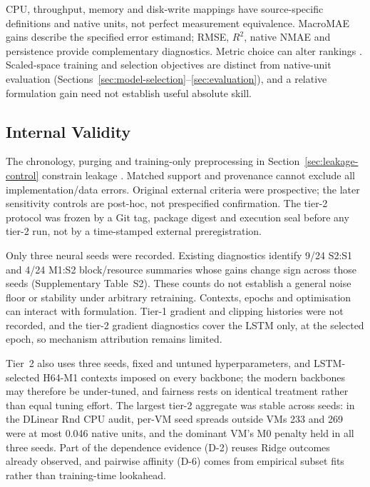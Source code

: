 \documentclass[a4paper,fleqn]{cas-dc}
\begin{document}
CPU, throughput, memory and disk-write mappings have source-specific
definitions and native units, not perfect measurement equivalence.
MacroMAE gains describe the specified error estimand; RMSE, $R^2$, native
NMAE and persistence provide complementary diagnostics. Metric choice can
alter rankings \citep{Hyndman2006Accuracy}. Scaled-space training and selection
objectives are distinct from native-unit evaluation
(Sections~\ref{sec:model-selection}--\ref{sec:evaluation}), and a relative
formulation gain need not establish useful absolute skill.

\subsection{Internal Validity}
\label{sec:threats-internal}

The chronology, purging and training-only preprocessing in
Section~\ref{sec:leakage-control} constrain leakage
\citep{Cerqueira2020Evaluation,Hyndman2021Forecasting}.
Matched support and provenance cannot exclude all implementation/data errors.
Original external criteria were prospective; the later sensitivity controls
are post-hoc, not prespecified confirmation. The tier-2 protocol was frozen
by a Git tag, package digest and execution seal before any tier-2 run, not
by a time-stamped external preregistration.

Only three neural seeds were recorded. Existing diagnostics identify 9/24
S2:S1 and 4/24 M1:S2 block/resource summaries whose gains change sign across
those seeds (Supplementary Table~S2). These counts do not establish a general noise floor or stability
under arbitrary retraining. Contexts, epochs and optimisation can interact
with formulation. Tier-1 gradient and clipping histories were not recorded,
and the tier-2 gradient diagnostics cover the LSTM only, at the selected
epoch, so mechanism attribution remains limited.

Tier~2 also uses three seeds, fixed and untuned hyperparameters, and
LSTM-selected H64-M1 contexts imposed on every backbone; the modern
backbones may therefore be under-tuned, and fairness rests on identical
treatment rather than equal tuning effort. The largest tier-2 aggregate was
stable across seeds: in the DLinear Rnd CPU audit, per-VM seed spreads
outside VMs 233 and 269 were at most 0.046 native units, and the
dominant VM's M0 penalty held in all three seeds. Part of the dependence
evidence (D-2) reuses Ridge outcomes already observed, and pairwise affinity
(D-6) comes from empirical subset fits rather than training-time lookahead.
\end{document}
